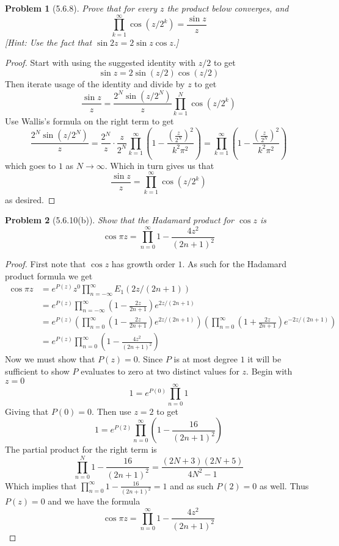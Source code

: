 \documentclass[10pt]{article}
\newcommand{\sk}{\vskip 10mm}
\theoremstyle{plain}
\newtheorem{problem}{Problem}
\theoremstyle{remark}
\begin{document}
\sk

\begin{problem}[5.6.8]
  Prove that for every $z$ the product below converges, and
  \[
    \prod_{k=1}^\infty \cos(z/2^k)=\frac{\sin z}{z}
  \]
  [Hint: Use the fact that $\sin 2z=2\sin z\cos z$.]
\end{problem}

\begin{proof}
  Start with using the suggested identity with $z/2$ to get
  \[
    \sin z=2\sin(z/2)\cos(z/2)
  \]
  Then iterate usage of the identity and divide by $z$ to get
  \[
    \frac{\sin z}{z} = \frac{2^N\sin(z/2^N)}{z}\prod_{k=1}^N\cos(z/2^k)
  \]
  Use Wallis's formula on the right term to get
  \[
    \frac{2^N\sin(z/2^N)}{z}=\frac{2^N}{z}\cdot\frac{z}{2^N}\prod_{k=1}^\infty(1-\frac{(\frac{z}{2^N})^2}{k^2\pi^2})=\prod_{k=1}^\infty(1-\frac{(\frac{z}{2^N})^2}{k^2\pi^2})
  \]
  which goes to $1$ as $N\rightarrow\infty$. Which in turn gives us that
  \[
    \frac{\sin z}{z}=\prod_{k=1}^\infty\cos(z/2^k)
  \]
  as desired.
\end{proof}

\sk

\begin{problem}[5.6.10(b)]
  Show that the Hadamard product for $\cos z$ is 
  \[
    \cos\pi z=\prod_{n=0}^\infty 1-\frac{4z^2}{(2n+1)^2}
  \]
\end{problem}

\begin{proof}
  First note that $\cos z$ has growth order $1$. As such for the Hadamard
  product formula we get
  \begin{align*}
    \cos\pi z&=e^{P(z)}z^0\prod_{n=-\infty}^\infty E_1(2z/(2n+1))\\
           &=e^{P(z)}\prod_{n=-\infty}^\infty (1-\frac{2z}{2n+1})e^{2z/(2n+1)}\\
           &=e^{P(z)}(\prod_{n=0}^\infty (1-\frac{2z}{2n+1})e^{2z/(2n+1)})(\prod_{n=0}^\infty (1+\frac{2z}{2n+1})e^{-2z/(2n+1)})\\
           &=e^{P(z)}\prod_{n=0}^\infty(1-\frac{4z^2}{(2n+1)^2})
  \end{align*}
  Now we must show that $P(z)=0$. Since $P$ is at most degree $1$
  it will be sufficient to show $P$ evaluates to zero at two distinct
  values for $z$. Begin with $z=0$
  \[
    1=e^{P(0)}\prod_{n=0}^\infty 1
  \]
  Giving that $P(0)=0$. Then use $z=2$ to get
  \[
    1=e^{P(2)}\prod_{n=0}^\infty(1-\frac{16}{(2n+1)^2})
  \]
  The partial product for the right term is
  \[
    \prod_{n=0}^N1-\frac{16}{(2n+1)^2}=\frac{(2N+3)(2N+5)}{4N^2-1}
  \]
  Which implies that $\prod_{n=0}^\infty 1-\frac{16}{(2n+1)^2}=1$ and as
  such $P(2)=0$ as well. Thus $P(z)=0$ and we have the formula
  \[
    \cos\pi z=\prod_{n=0}^\infty 1-\frac{4z^2}{(2n+1)^2}
  \]
\end{proof}
\end{document}
